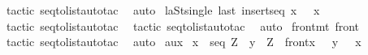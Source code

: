 \begin{isabellebody}
%
\isadelimproof
%
\endisadelimproof
%
\isatagproof
{}\isamarkupfalse%
\ {\isacharparenleft}tactic\ {\isacharverbatimopen}seq{\isacharunderscore}to{\isacharunderscore}list{\isacharunderscore}auto{\isacharunderscore}tac\ {}{\isacharverbatimclose}{\isacharparenright}\isanewline
{}\isamarkupfalse%
\ auto\isanewline
{}\isamarkupfalse%
%
\endisatagproof
{\isafoldproof}%
%
\isadelimproof
\isanewline
%
\endisadelimproof
\isanewline
\isanewline
{}\isamarkupfalse%
\ laSt{\isacharunderscore}single{\isacharcolon}\ {\isachardoublequoteopen}{\isacharparenleft}last\ {\isacharparenleft}insertseq\ x\ {\isacharpercent}{\isacharless}{\isacharpercent}{\isachargreater}{\isacharparenright}{\isacharparenright}\ {\isacharequal}\ x{\isachardoublequoteclose}\isanewline
%
\isadelimproof
%
\endisadelimproof
%
\isatagproof
{}\isamarkupfalse%
\ {\isacharparenleft}tactic\ {\isacharverbatimopen}seq{\isacharunderscore}to{\isacharunderscore}list{\isacharunderscore}auto{\isacharunderscore}tac\ {}{\isacharverbatimclose}{\isacharparenright}\isanewline
{}\isamarkupfalse%
\ {\isacharparenleft}tactic\ {\isacharverbatimopen}seq{\isacharunderscore}to{\isacharunderscore}list{\isacharunderscore}auto{\isacharunderscore}tac\ {}{\isacharverbatimclose}{\isacharparenright}\isanewline
{}\isamarkupfalse%
\ auto\isanewline
{}\isamarkupfalse%
%
\endisatagproof
{\isafoldproof}%
%
\isadelimproof
\isanewline
%
\endisadelimproof
\isanewline
\isanewline
\isanewline
\isanewline
\isanewline
{}\isamarkupfalse%
\ front{\isacharunderscore}mt{\isacharcolon}\ {\isachardoublequoteopen}front{\isacharparenleft}{\isacharpercent}{\isacharless}{\isacharpercent}{\isachargreater}{\isacharparenright}\ {\isacharequal}\ {\isacharpercent}{\isacharless}{\isacharpercent}{\isachargreater}\ {\isachardoublequoteclose}\isanewline
%
\isadelimproof
%
\endisadelimproof
%
\isatagproof
{}\isamarkupfalse%
\ {\isacharparenleft}tactic\ {\isacharverbatimopen}seq{\isacharunderscore}to{\isacharunderscore}list{\isacharunderscore}auto{\isacharunderscore}tac\ {}{\isacharverbatimclose}{\isacharparenright}\isanewline
{}\isamarkupfalse%
\ auto\isanewline
{}\isamarkupfalse%
%
\endisatagproof
{\isafoldproof}%
%
\isadelimproof
\isanewline
%
\endisadelimproof
\isanewline
\isanewline
{}\isamarkupfalse%
\ aux{\isacharcolon}\ \isanewline
{\isachardoublequoteopen}{\isacharparenleft}x\ {\isacharcolon}\ seq\ Z\ {\isacharampersand}\ y\ {\isacharcolon}\ Z{\isacharparenright}\ {\isacharminus}{\isacharminus}{\isachargreater}\ front{\isacharparenleft}x\ {\isacharpercent}{\isacharampersand}{\isacharcircum}\ {\isacharpercent}{\isacharless}\ y\ {\isacharpercent}{\isachargreater}{\isacharparenright}\ {\isacharequal}\ x\ {\isachardoublequoteclose}\isanewline

\end{isabellebody}
